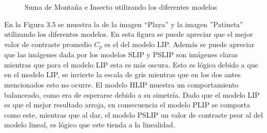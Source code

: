 \begin{figure}
\begin{center}
		\caption{Suma de Monta\~na e Insecto utilizando los diferentes modelos}
	\end{center}
\end{figure}

En la Figura 3.5 se muestra la de la imagen  ``Playa'' y la imagen ''Patineta'' utilizando los diferentes modelos. En esta figura se puede apreciar que el mejor valor de contraste promedio $C_p$ es el del modelo LIP. Adem\'as se puede apreciar que las im\'agenes dada por los modelos SLIP y PSLIP son im\'agenes claras mientras que para el modelo LIP esta es m\'as oscura. Esto es l\'ogico debido a que en el modelo LIP, se invierte la escala de gris mientras que en los dos antes mencionados esto no ocurre. El modelo HLIP muestra un comportamiento balanceado, como era de esperarse debido a su simetr\'ia. Dado que el modelo LIP es que el mejor resultado arroja, en consecuencia el modelo PLIP se comporta como este, mientras que al dar, el modelo PSLIP un valor de contraste peor al del modelo lineal, es l\'ogico que este tienda a la linealidad.

